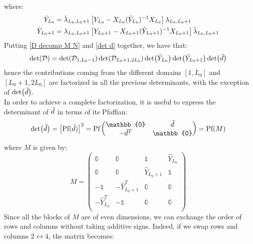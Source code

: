 where:
\begin{equation}\label{Y hat}
\begin{split}
        \hat{Y}_{L_0} &= \Bar{\lambda}_{L_0, L_0 + 1} \left[ Y_{L_0} - X_{L_0} (\Tilde{Y}_{L_0})^{-1} X_{L_0} \right] \lambda_{L_0, L_0 + 1} \\
    \hat{Y}_{L_0 + 1} &= \lambda_{L_0, L_0 + 1} \left[ Y_{L_0 + 1} - X_{L_0 + 1} (\Tilde{Y}_{L_0 + 1})^{-1} X_{L_0 + 1} \right] \Bar{\lambda}_{L_0, L_0 + 1} \\
\end{split}
\end{equation}
Putting \eqref{D decomp M N} and \eqref{det d} together, we have that:
\begin{equation}\label{last step fact}
    \det(\mathcal{D}) = \det(\mathcal{D}_{1, L_0 - 1}) \det(\mathcal{D}_{L_0 + 1, 2L_0}) \det(\Tilde{Y}_{L_0})  \det(\Tilde{Y}_{L_0 + 1}) \det(\Tilde{d})
\end{equation}
hence the contributions coming from the different domains $[1, L_0]$ and $[L_0 + 1, 2L_0]$ are factorized in all the previous determinants, with the exception of $\det(\Tilde{d})$.
\\ In order to achieve a complete factorization, it is useful to express the determinant of $\Tilde{d}$ in terms of its Pfaffian:
\begin{equation}
    \det(\Tilde{d}) = \left[ \textrm{Pf}(\Tilde{d}) \right]^2 = \textrm{Pf} \begin{pmatrix}
        \mathbb{0} & \Tilde{d} \\
        - \Tilde{d}^{T} & \mathbb{0} \\
    \end{pmatrix} = \textrm{Pf}(M)
\end{equation}
where $M$ is given by:
\begin{equation}
    M = \begin{pmatrix}
        \mathbb{0} & \mathbb{0} & \mathbb{1} & \hat{Y}_{L_0} \\
        \mathbb{0} & \mathbb{0} & \hat{Y}_{L_0 + 1} & \mathbb{1} \\
        -\mathbb{1} & - \hat{Y}_{L_0 + 1}^{T} & \mathbb{0} & \mathbb{0} \\
        - \hat{Y}_{L_0}^{T} & - \mathbb{1} & \mathbb{0} & \mathbb{0} \\
        
    \end{pmatrix}
\end{equation}
Since all the blocks of $M$ are of even dimensions, we can exchange the order of rows and columns without taking additive signs. Indeed, if we swap rows and columns $2 \leftrightarrow 4$, the matrix becomes:
